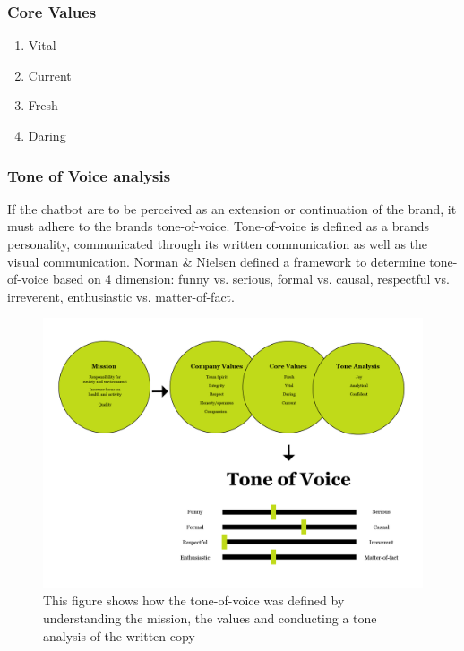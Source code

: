 \vspace{2,5mm}

        \subsubsection{Core Values}
        \begin{enumerate}
            \item Vital
            \item Current
            \item Fresh
            \item Daring
        \end{enumerate}
    
\vspace{5mm} %

        \subsubsection{Tone of Voice analysis}
    
        If the chatbot are to be perceived as an extension or continuation of the brand, it must adhere to the brands tone-of-voice. Tone-of-voice is defined as a brands personality, communicated through its written communication as well as the visual communication. Norman \& Nielsen defined a framework to determine tone-of-voice based on 4 dimension: funny vs. serious, formal vs. causal, respectful vs. irreverent, enthusiastic vs. matter-of-fact.
    
        \begin{figure}
            \centering
            \includegraphics[width=\textwidth]{figures/Tone-of-voice.png}
            \caption{This figure shows how the tone-of-voice was defined by understanding the mission, the values and conducting a tone analysis of the written copy}
            \label{fig:tov}
        \end{figure}
    
